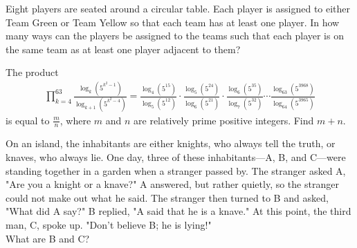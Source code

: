 \begin{problem}
    Eight players are seated around a circular table. Each player is assigned to either Team Green or Team Yellow so that each team has at least one player. In how many ways can the players be assigned to the teams such that each player is on the same team as at least one player adjacent to them?
\end{problem}

\begin{problem}[F][3][2025 AIME II/4]
The product
\begin{align*}
\prod_{k=4}^{63} \frac{\log_k(5^{k^2-1})}{\log_{k+1}(5^{k^2-4})} = \frac{\log_4(5^{15})}{\log_5(5^{12})} \cdot \frac{\log_5(5^{24})}{\log_6(5^{21})} \cdot \frac{\log_6(5^{35})}{\log_7(5^{32})} \cdots \frac{\log_{63}(5^{3968})}{\log_{64}(5^{3965})}
\end{align*}
is equal to $\frac{m}{n}$, where $m$ and $n$ are relatively prime positive integers. Find $m + n$.
\end{problem}

\begin{problem}[F][2]
On an island, the inhabitants are either knights, who always tell the truth, or knaves, who always lie. One day, three of these inhabitants—A, B, and C—were standing together in a garden when a stranger passed by. The stranger asked A, "Are you a knight or a knave?" A answered, but rather quietly, so the stranger could not make out what he said. The stranger then turned to B and asked, "What did A say?" B replied, "A said that he is a knave." At this point, the third man, C, spoke up. "Don't believe B; he is lying!"\\

    What are B and C?
\end{problem}




